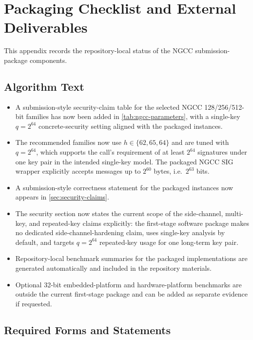 \section{Packaging Checklist and External Deliverables}
\label{apx:submission-checklist}

This appendix records the repository-local status of the NGCC submission-package components.

\subsection{Algorithm Text}

\begin{itemize}
    \item A submission-style security-claim table for the selected NGCC 128/256/512-bit families has now been added in \cref{tab:ngcc-parameters}, with a single-key $q=2^{64}$ concrete-security setting aligned with the packaged instances.
    \item The recommended families now use $h\in\{62,65,64\}$ and are tuned with $q=2^{64}$, which supports the call's requirement of at least $2^{64}$ signatures under one key pair in the intended single-key model. The packaged NGCC SIG wrapper explicitly accepts messages up to $2^{60}$ bytes, i.e.\ $2^{63}$ bits.
    \item A submission-style correctness statement for the packaged instances now appears in \cref{sec:security-claims}.
    \item The security section now states the current scope of the side-channel, multi-key, and repeated-key claims explicitly: the first-stage software package makes no dedicated side-channel-hardening claim, uses single-key analysis by default, and targets $q=2^{64}$ repeated-key usage for one long-term key pair.
    \item Repository-local benchmark summaries for the packaged implementations are generated automatically and included in the repository materials.
    \item Optional 32-bit embedded-platform and hardware-platform benchmarks are outside the current first-stage package and can be added as separate evidence if requested.
\end{itemize}

\subsection{Required Forms and Statements}

